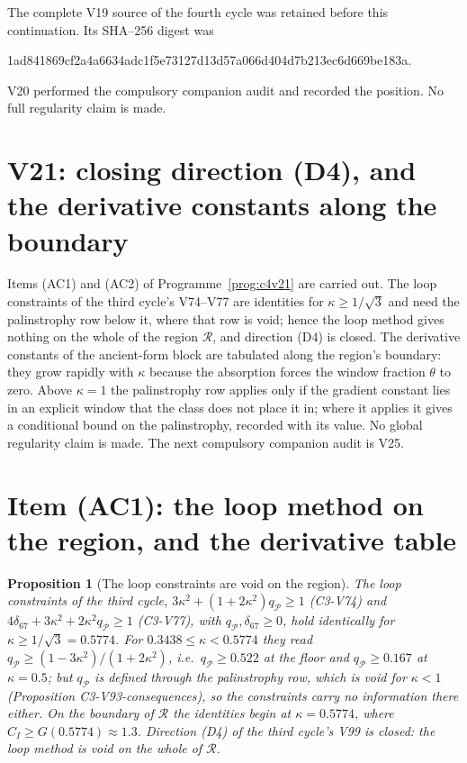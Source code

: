 \documentclass[11pt]{article}
\theoremstyle{plain}
\newtheorem{proposition}[theorem]{Proposition}
\theoremstyle{definition}
\theoremstyle{remark}
\begin{document}
The complete V19 source of the fourth cycle was retained before this
continuation.  Its SHA--256 digest was
\begin{center}\scriptsize\ttfamily
1ad841869cf2a4a6634adc1f5e73127d13d57a066d404d7b213ec6d669be183a.
\end{center}
V20 performed the compulsory companion audit and recorded the
position.  No full regularity claim is made.

\section{V21: closing direction (D4), and the derivative constants along the boundary}
\label{sec:c4v21-entry}

Items (AC1) and (AC2) of Programme~\ref{prog:c4v21} are carried out.
The loop constraints of the third cycle's V74--V77 are identities for
\(\kappa\ge1/\sqrt3\) and need the palinstrophy row below it, where that row
is void; hence the loop method gives nothing on the whole of the
region \(\mathcal R\), and direction (D4) is closed.  The derivative constants
of the ancient-form block are tabulated along the region's boundary:
they grow rapidly with \(\kappa\) because the absorption forces the window
fraction \(\theta\) to zero.  Above \(\kappa=1\) the palinstrophy row applies only if
the gradient constant lies in an explicit window that the class does
not place it in; where it applies it gives a conditional bound on
the palinstrophy, recorded with its value.  No global regularity
claim is made.  The next compulsory companion audit is V25.

\section{Item (AC1): the loop method on the region, and the derivative table}
\label{sec:c4v21-loops}

\begin{proposition}[The loop constraints are void on the region]
\label{prop:c4v21-loops}
The loop constraints of the third cycle, \(3\kappa^2+(1+2\kappa^2)q_{\mathcal P}\ge1\)
(C3-V74) and \(4\delta_{67}+3\kappa^2+2\kappa^2q_{\mathcal P}\ge1\) (C3-V77), with \(q_{\mathcal P},\delta_{67}\ge0\), hold
identically for \(\kappa\ge1/\sqrt3=0.5774\).  For \(0.3438\le\kappa<0.5774\) they read
\(q_{\mathcal P}\ge(1-3\kappa^2)/(1+2\kappa^2)\), i.e.\ \(q_{\mathcal P}\ge0.522\) at the floor and \(q_{\mathcal P}\ge0.167\) at
\(\kappa=0.5\); but \(q_{\mathcal P}\) is defined through the palinstrophy row, which
is void for \(\kappa<1\) (Proposition C3-V93-consequences), so the constraints
carry no information there either.  On the boundary of \(\mathcal R\) the
identities begin at \(\kappa=0.5774\), where \(C_I\ge G(0.5774)\approx1.3\).  Direction (D4)
of the third cycle's V99 is closed: the loop method is void on the
whole of \(\mathcal R\).
\end{proposition}
\end{document}
